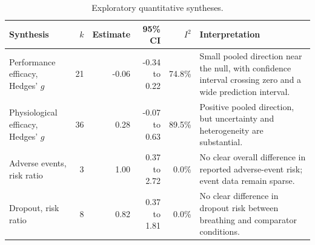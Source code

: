 \begin{table}[H]
\centering
\caption{Exploratory quantitative syntheses.}
\label{tab:meta}
\small
\begin{tabularx}{\textwidth}{@{}lrrrrX@{}}
\toprule
Synthesis & $k$ & Estimate & 95\% CI & $I^2$ & Interpretation \\
\midrule
Performance efficacy, Hedges' $g$ & 21 & -0.06 & -0.34 to 0.22 & 74.8\% & Small pooled direction near the null, with confidence interval crossing zero and a wide prediction interval. \\
Physiological efficacy, Hedges' $g$ & 36 & 0.28 & -0.07 to 0.63 & 89.5\% & Positive pooled direction, but uncertainty and heterogeneity are substantial. \\
Adverse events, risk ratio & 3 & 1.00 & 0.37 to 2.72 & 0.0\% & No clear overall difference in reported adverse-event risk; event data remain sparse. \\
Dropout, risk ratio & 8 & 0.82 & 0.37 to 1.81 & 0.0\% & No clear difference in dropout risk between breathing and comparator conditions. \\
\bottomrule
\end{tabularx}
\end{table}
